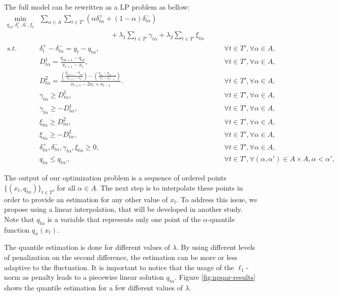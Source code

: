 The full model can be rewritten as a LP problem as bellow:
\begin{eqnarray}
\min_{q_{\alpha t},\delta^+_{t}, \delta_t^-, \xi_t} & \sum_{\alpha \in A} \sum_{t \in T'}\left(\alpha\delta_{t \alpha }^{+}+(1-\alpha)\delta_{t \alpha }^{-}\right) & \\
& \qquad \qquad \qquad \qquad \qquad + \lambda_1\sum_{t \in T'}\gamma_{t \alpha } + \lambda_2\sum_{t \in T'}\xi_{t \alpha } & \nonumber \\
s.t. & \delta_{t}^{+}-\delta_{t \alpha }^{-}=y_{t}-q_{t \alpha }, & \qquad\forall t \in T',\forall \alpha \in A,\\
   & D^{1}_{t \alpha }=\frac{q_{\alpha t+1}-q_{\alpha t}}{x_{t+1}-x_{t}},
    & \qquad\forall t \in T',\forall \alpha \in A,\\   
 & D^{2}_{t \alpha }=\frac{\left(\frac{q_{\alpha t+1}-q_{\alpha t}}{x_{t+1}-x_{t}}\right)-\left(\frac{q_{\alpha t}-q_{\alpha t-1}}{x_{t}-x_{t-1}}\right)}{x_{t+1}-2x_{t} + x_{t-1}}.
  & \qquad\forall t \in T',\forall \alpha \in A,\\
 & \gamma_{t \alpha}\geq D^1_{t \alpha }, & \qquad\forall t \in T',\forall \alpha \in A,\\
  & \gamma_{t \alpha}\geq-D^1_{t \alpha}, & \qquad\forall t \in T',\forall \alpha \in A,\\
  & \xi_{t \alpha}\geq D^2_{t \alpha }, & \qquad\forall t \in T',\forall \alpha \in A,\\
 & \xi_{t \alpha}\geq-D^2_{t \alpha}, & \qquad\forall t \in T',\forall \alpha \in A,\\
 & \delta_{t \alpha}^{+},\delta_{t \alpha}^{-},\gamma_{t \alpha}, \xi_{t \alpha}\geq0, & \qquad\forall t \in T',\forall \alpha \in A,\\
  & q_{t \alpha} \leq q_{t \alpha'}, & \qquad \forall t \in T', \forall (\alpha, \alpha') \in A \times A, \alpha < \alpha', 
  \end{eqnarray}


The output of our optimization problem is a sequence of ordered points $\{(x_t, q_{t \alpha})\}_{t \in T}$, for all $\alpha \in A$. The next step is to interpolate these points in order to provide an estimation for any other value of $x_t$. To address this issue, we propose using a linear interpolation, that will be developed in another study. Note that $q_{t \alpha}$ is a variable that represents only one point of the $\alpha$-quantile function $q_\alpha(x_t)$. 

The quantile estimation is done for different values of $\lambda$. By using different levels of penalization on the second difference, the estimation can be more or less adaptive to the fluctuation. It is important to notice that the usage of the $\ell_1$-norm as penalty leads to a piecewise linear solution $q_{t \alpha}$. %
Figure \ref{fig:npqar-results} shows the quantile estimation for a few different values of $\lambda$. 



